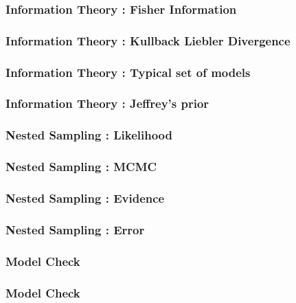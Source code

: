 \documentclass{beamer}
\begin{document}
\begin{frame}
  \frametitle{Information Theory : Fisher Information}

\end{frame}
\begin{frame}
  \frametitle{Information Theory : Kullback Liebler Divergence}

\end{frame}
\begin{frame}
  \frametitle{Information Theory : Typical set of models}

\end{frame}
\begin{frame}
  \frametitle{Information Theory : Jeffrey's prior }

\end{frame}
\begin{frame}
  \frametitle{Nested Sampling : Likelihood}

\end{frame}
\begin{frame}
  \frametitle{Nested Sampling : MCMC}

\end{frame}
\begin{frame}
  \frametitle{Nested Sampling : Evidence}

\end{frame}
\begin{frame}
  \frametitle{Nested Sampling : Error}

\end{frame}
\begin{frame}
  \frametitle{Model Check}

\end{frame}
\begin{frame}
  \frametitle{Model Check}

\end{frame}
\end{document}
